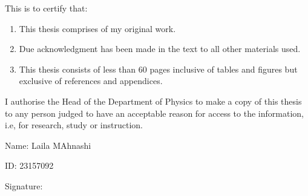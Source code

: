 This is to certify that:

\begin{enumerate}

    \item This thesis comprises of my original work.

    \item  Due acknowledgment has been made in the text to all other materials used.

    \item This thesis consists of less than 60 pages inclusive of tables and figures but exclusive of references and appendices.
\end{enumerate}

I authorise the Head of the Department of Physics to make a copy of this thesis to any person judged to have an acceptable reason for access to the information, i.e, for research, study or instruction.


Name: Laila MAhnashi

\vspace{8mm}
ID: 23157092

\vspace{8mm}


Signature:
 